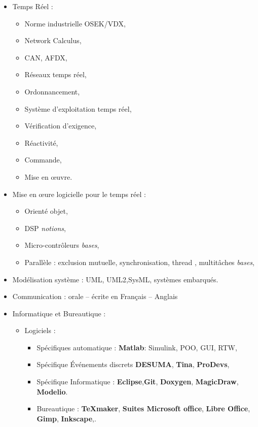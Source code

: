 \documentclass{article}
\begin{document}
\begin{itemize}
\item Temps Réel : 
	\begin{itemize}
	\item Norme industrielle OSEK/VDX,
	\item Network Calculus,
	\item CAN, AFDX,
	\item Réseaux temps réel, 
	\item Ordonnancement, 
	\item Système d'exploitation temps réel,
	\item Vérification d’exigence, 
	\item Réactivité, 
	\item Commande,
	\item Mise en \oe uvre.
	\end{itemize}	
	
\item Mise en \oe ure logicielle pour le temps réel : %
	\begin{itemize}
	\item Orienté objet,
	\item DSP \textit{notions},
	\item Micro-contrôleurs \textit{bases},
	\item Parallèle : exclusion mutuelle, synchronisation, thread , multitâches \textit{bases},
	
	\end{itemize}
\item Modélisation système : UML, UML2,SysML, systèmes embarqués.

\item Communication : orale -- écrite en Français -- Anglais

\item Informatique et Bureautique : 
	\begin{itemize}
	\item Logiciels : 
		\begin{itemize}
		\item Spécifiques automatique : \textbf{Matlab}: Simulink, POO, GUI, RTW, 
		\item Spécifique Événements discrets  \textbf{DESUMA}, \textbf{Tina}, \textbf{ProDevs}, 
		\item Spécifique Informatique : \textbf{Eclipse},\textbf{Git}, \textbf{Doxygen}, \textbf{MagicDraw}, \textbf{Modelio}.
		\item Bureautique : \textbf{\TeX maker}, \textbf{Suites Microsoft office}, \textbf{Libre Office}, \textbf{Gimp}, \textbf{Inkscape},.
		\end{itemize}
	

\end{itemize}
\end{itemize}
\end{document}
